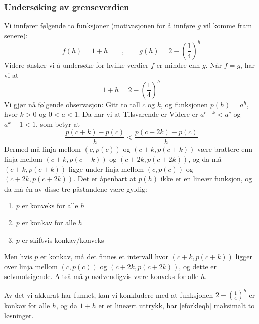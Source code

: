 \subsubsection{Undersøking av grenseverdien}
Vi innfører følgende to funksjoner (motivasjonen for å innføre $ g $ vil komme fram senere):
\[ f(h)=1+h \qquad,\qquad g(h)=2-\left(\frac{1}{4}\right)^{h}\]
Videre ønsker vi å undersøke for hvilke verdier $ f $ er mindre enn  $ g $. Når $ f=g $, har vi at
\begin{equation}\label{eforkleqh}
	1+h=2-\left(\frac{1}{4}\right)^h 
\end{equation}
Vi gjør nå følgende observasjon: Gitt to tall $ c $ og $ k $, og funksjonen $ p(h)=a^h $, hvor $ k>0 $ og $ 0<a<1 $. Da har vi at
Tilsvarende er
Videre er $ a^{c+k}<a^c $ og $ a^k-1<1 $, som betyr at
\[ \frac{p(c+k)-p(c)}{h}<\frac{p(c+2k)-p(c)}{h} \]
Dermed må linja mellom $ (c, p(c)) $ og $ (c+k, p(c+k)) $ være brattere enn linja mellom $ (c+k, p(c+k)) $ og $ (c+2k, p(c+2k)) $, og da må $ (c+k, p(c+k)) $ ligge under linja mellom $ (c, p(c)) $ og $ (c+2k, p(c+2k)) $.
Det er åpenbart at $ p(h) $ ikke er en lineær funksjon, og da må én av disse tre påstandene være gyldig:
\begin{enumerate}[label=(\alph*)]
	\item $ p $ er konveks for alle $ h$
	\item $ p $ er konkav for alle $ h $
	\item $ p $ er skiftvis konkav/konveks
\end{enumerate}
Men hvis $ p $ er konkav, må det finnes et intervall hvor $ (c+k, p(c+k)) $ ligger over linja mellom $ (c, p(c)) $ og $ (c+2k, p(c+2k)) $, og dette er selvmotsigende. Altså må $ p $ nødvendigvis være konveks for alle $ h $.\vsk

Av det vi akkurat har funnet, kan vi konkludere med at funksjonen $2-\left(\frac{1}{4}\right)^h $ er konkav for alle $ h $, og da $ 1+h$ er et lineært uttrykk, har \eqref{eforkleqh} maksimalt to løsninger.\vsk

